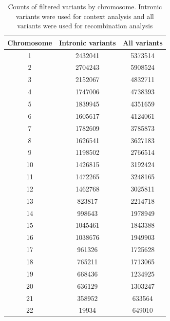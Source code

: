 \documentclass[12pt]{article}%
\begin{document}
\begin{table}[htp!]
\centering
\begin{tabular}{ c c c }
\hline
\bf{Chromosome} & \bf{Intronic variants} & \bf{All variants} \\
\hline
\hline
         1 &           2432041 &      5373514 \\
         2 &           2704243 &      5908524 \\
         3 &           2152067 &      4832711 \\
         4 &           1747006 &      4738393 \\
         5 &           1839945 &      4351659 \\
         6 &           1605617 &      4124061 \\
         7 &           1782609 &      3785873 \\
         8 &           1626541 &      3627183 \\
         9 &           1198502 &      2766514 \\
        10 &           1426815 &      3192424 \\
        11 &           1472265 &      3248165 \\
        12 &           1462768 &      3025811 \\
        13 &            823817 &      2214718 \\
        14 &            998643 &      1978949 \\
        15 &           1045461 &      1843388 \\
        16 &           1038676 &      1949903 \\
        17 &            961326 &      1725628 \\
        18 &            765211 &      1713065 \\
        19 &            668436 &      1234925 \\
        20 &            636129 &      1303247 \\
        21 &            358952 &       633564 \\
        22 &             19934 &       649010 \\
\hline
\end{tabular}
\caption{Counts of filtered variants by chromosome. Intronic variants were used for context analysis and all             variants were used for recombination analysis }
\label{tab:supp-counts}
\end{table}
\end{document}
